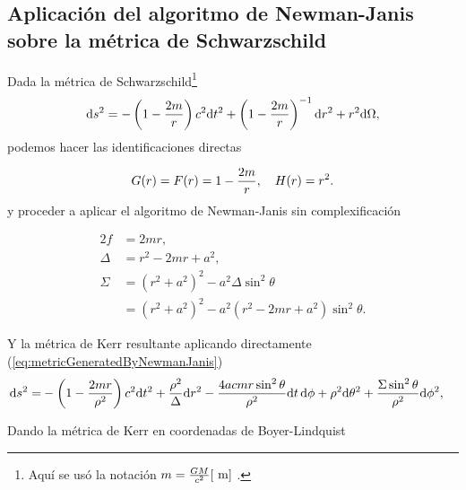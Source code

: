 \subsection{Aplicación del algoritmo de Newman-Janis sobre la métrica de Schwarzschild}
Dada la métrica de Schwarzschild\footnote{Aquí se usó la notación $m=\frac{G M}{c^2}[\mathrm{~m}]$ .}
\begin{equation}
    \mathrm{d} s^2=-\left(1-\frac{2 m}{r}\right) c^2 \mathrm{d}  t^2+\left(1-\frac{2m}{r}\right)^{-1} \mathrm{d} r^2+r^2\mathrm{d} \Omega,
\end{equation}
podemos hacer las identificaciones directas

\begin{equation}
    G(r) = F(r) = 1-\frac{2m}{r}, \quad H(r) = r^2.
\end{equation}
y proceder a aplicar el algoritmo de Newman-Janis sin complexificación

\begin{equation}
    \begin{aligned}
        2f     & =  2mr,                                                        \\
        \Delta & = r^2 - 2mr + a^2,                                             \\
        \Sigma & = \left(r^2+a^2\right)^2-a^2 \Delta \sin ^2 \theta             \\
               & =\left(r^2+a^2\right)^2-a^2 (r^2 - 2mr + a^2) \sin ^2 \theta .
    \end{aligned}
\end{equation}

Y la métrica de Kerr resultante aplicando directamente (\ref{eq:metricGeneratedByNewmanJanis})
\begin{align}
    \mathrm{d}s^2 = &
    - \left(1 - \frac{2mr}{\rho^2}\right) c^2 \mathrm{d}t^2
    + \frac{\rho^2}{\Delta} \mathrm{d}r^2
    - \frac{4a c mr \sin^2\theta}{\rho^2} \mathrm{d}t\, \mathrm{d}\phi
    + \rho^2 \mathrm{d}\theta^2
    + \frac{\Sigma \sin^2\theta}{\rho^2} \mathrm{d}\phi^2,
\end{align}

Dando la métrica de Kerr en coordenadas de Boyer-Lindquist

